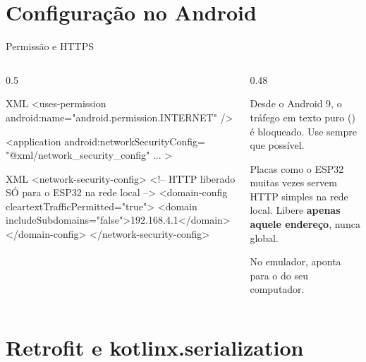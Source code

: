 \documentclass[aspectratio=169,10pt]{beamer}
\begin{document}
\section{Configuração no Android}

\begin{frame}[fragile]{Permissão e HTTPS}
  \begin{columns}[T]
    \begin{column}{0.5\textwidth}
\begin{codigo}[title=AndroidManifest.xml]{XML}
<uses-permission
  android:name="android.permission.INTERNET" />

<application
  android:networkSecurityConfig=
    "@xml/network_security_config" ... >
\end{codigo}
\begin{codigo}[title=res/xml/network\_security\_config.xml]{XML}
<network-security-config>
  <!-- HTTP liberado SÓ para o ESP32 na rede local -->
  <domain-config cleartextTrafficPermitted="true">
    <domain includeSubdomains="false">192.168.4.1</domain>
  </domain-config>
</network-security-config>
\end{codigo}
    \end{column}
    \begin{column}{0.48\textwidth}
      \begin{conceito}
        Desde o Android 9, o tráfego em texto puro () é bloqueado. Use  sempre que possível.
      \end{conceito}
      \begin{atencao}
        Placas como o ESP32 muitas vezes servem HTTP simples na rede local. Libere \textbf{apenas aquele endereço}, nunca  global.
      \end{atencao}
      \begin{dica}
        No emulador,  aponta para o  do seu computador.
      \end{dica}
    \end{column}
  \end{columns}
\end{frame}

\section{Retrofit e kotlinx.serialization}
\end{document}
